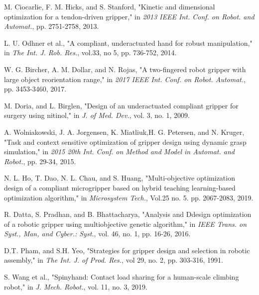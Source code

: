 \documentclass[letterpaper, 10 pt, conference]{ieeeconf}  %
\begin{document}
\begin{thebibliography}{99}

 M. Ciocarlie, F. M. Hicks, and S. Stanford, "Kinetic and dimensional optimization for a tendon-driven gripper," in \emph{2013 IEEE Int. Conf. on Robot. and Automat.}, pp. 2751-2758, 2013.

 L. U. Odhner et al., "A compliant, underactuated hand for robust manipulation," in \emph{The Int. J. Rob. Res.}, vol.33, no 5, pp. 736-752, 2014.

 W. G. Bircher, A. M. Dollar, and N. Rojas, "A two-fingered robot gripper with large object reorientation range," in \emph{2017 IEEE Int. Conf. on Robot. Automat.}, pp. 3453-3460, 2017.


 M. Doria, and L. Birglen, "Design of an underactuated compliant gripper for surgery using nitinol," in \emph{J. of Med. Dev.}, vol. 3, no. 1, 2009.

 A. Wolniakowski, J. A. Jorgensen, K. Miatliuk,H. G. Petersen, and N. Kruger, "Task and context sensitive optimization of gripper design using dynamic grasp simulation," in \emph{2015 20th Int. Conf. on Method and Model in Automat. and Robot.}, pp. 29-34, 2015.

 N. L. Ho, T. Dao, N. L. Chau, and S. Huang, "Multi-objective optimization design of a compliant microgripper based on hybrid teaching learning-based optimization algorithm," in \emph{Microsystem Tech.}, Vol.25 no. 5. pp. 2067-2083, 2019.

 R. Datta, S. Pradhan, and B. Bhattacharya, "Analysis and Ddesign optimization of a robotic gripper using multiobjective genetic algorithm," in \emph{IEEE Trans. on Syst., Man, and Cyber.: Syst.}, vol. 46, no. 1, pp. 16-26, 2016.

 D.T. Pham, and S.H. Yeo, "Strategies for gripper design and selection in robotic assembly," in \emph{The Int. J. of Prod. Res.}, vol 29, no. 2, pp. 303-316, 1991.

 S. Wang et al., "Spinyhand: Contact load sharing for a human-scale climbing robot," in \emph{J. Mech. Robot.}, vol. 11, no. 3, 2019.


\end{thebibliography}
\end{document}
